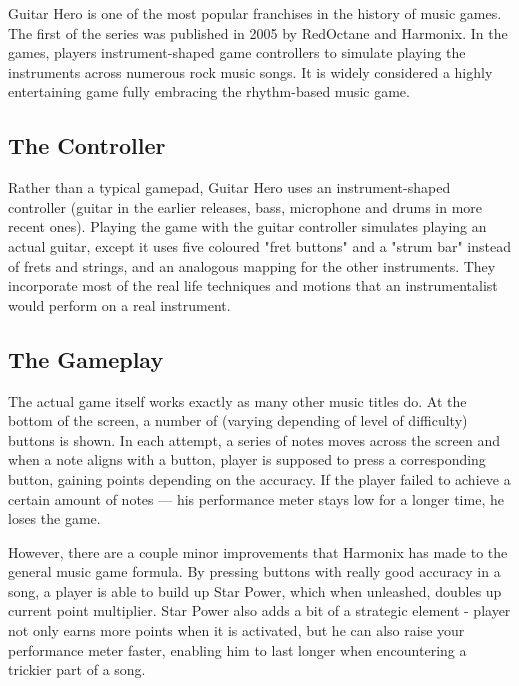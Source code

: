 Guitar Hero is one of the most popular franchises in the history of music games. The first of the series was published in 2005 by RedOctane and Harmonix. In the games, players instrument-shaped game controllers to simulate playing the instruments across numerous rock music songs. It is widely considered a highly entertaining game fully embracing the rhythm-based music game.

\vspace{10pt}


\subsection{The Controller}


Rather than a typical gamepad, Guitar Hero uses an instrument-shaped controller (guitar in the earlier releases, bass, microphone and drums in more recent ones). Playing the game with the guitar controller simulates playing an actual guitar, except it uses five coloured "fret buttons" and a "strum bar" instead of frets and strings, and an analogous mapping for the other instruments. They incorporate most of the real life techniques and motions that an instrumentalist would perform on a real instrument.

\vspace{10pt}


\subsection{The Gameplay}

The actual game itself works exactly as many other music titles do. At the bottom of the screen, a number of (varying depending of level of difficulty) buttons is shown. In each attempt, a series of notes moves across the screen and when a note aligns with a button, player is supposed to press a corresponding button, gaining points depending on the accuracy. If the player failed to achieve a certain amount of notes — his performance meter stays low for a longer time, he loses the game.

However, there are a couple minor improvements that Harmonix has made to the general music game formula. By pressing buttons with really good accuracy in a song, a player is able to build up Star Power, which when unleashed, doubles up current point multiplier. Star Power also adds a bit of a strategic element - player not only earns more points when it is activated, but he can also raise your performance meter faster, enabling him to last longer when encountering a trickier part of a song.


